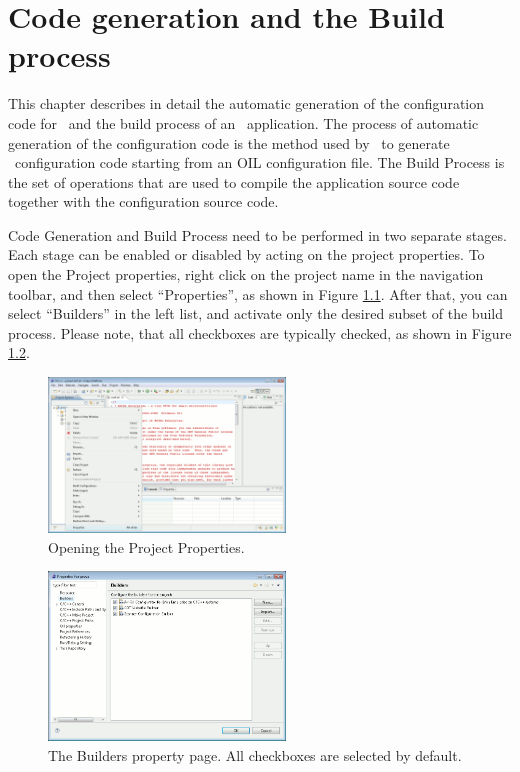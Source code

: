 \chapter{Code generation and the Build process}
\label{cha:code-generation}

This chapter describes in detail the automatic generation of the
configuration code for \ee\ and the build process of an \ee\
application. The process of automatic generation of the configuration
code is the method used by \rtd\ to generate \ee\ configuration code
starting from an OIL configuration file. The Build Process is the set
of operations that are used to compile the application source code
together with the configuration source code.

Code Generation and Build Process need to be performed in two separate
stages. Each stage can be enabled or disabled by acting on the project
properties. To open the Project properties, right click on the project
name in the navigation toolbar, and then select ``Properties'', as
shown in Figure \ref{fig:build1}. After that, you can select
``Builders'' in the left list, and activate only the desired subset of
the build process. Please note, that all checkboxes are typically
checked, as shown in Figure \ref{fig:build2}.

\begin{figure}
  \begin{center}
    \includegraphics[width=6.3cm, bb=0 0 1094 718]{images/build1.png}
  \end{center}
  \caption{Opening the Project Properties.}
  \label{fig:build1}
\end{figure}

\begin{figure}
  \begin{center}
    \includegraphics[width=6.3cm, bb=0 0 775 552]{images/build2.png}
  \end{center}
  \caption{The Builders property page. All checkboxes are selected by
    default.}
  \label{fig:build2}
\end{figure}

